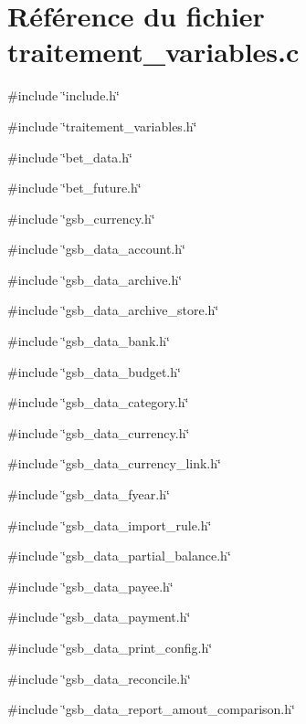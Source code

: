 \section{Référence du fichier traitement\_\-variables.c}
\label{traitement__variables_8c}
{\ttfamily \#include \char`\"{}include.h\char`\"{}}\par
{\ttfamily \#include \char`\"{}traitement\_\-variables.h\char`\"{}}\par
{\ttfamily \#include \char`\"{}bet\_\-data.h\char`\"{}}\par
{\ttfamily \#include \char`\"{}bet\_\-future.h\char`\"{}}\par
{\ttfamily \#include \char`\"{}gsb\_\-currency.h\char`\"{}}\par
{\ttfamily \#include \char`\"{}gsb\_\-data\_\-account.h\char`\"{}}\par
{\ttfamily \#include \char`\"{}gsb\_\-data\_\-archive.h\char`\"{}}\par
{\ttfamily \#include \char`\"{}gsb\_\-data\_\-archive\_\-store.h\char`\"{}}\par
{\ttfamily \#include \char`\"{}gsb\_\-data\_\-bank.h\char`\"{}}\par
{\ttfamily \#include \char`\"{}gsb\_\-data\_\-budget.h\char`\"{}}\par
{\ttfamily \#include \char`\"{}gsb\_\-data\_\-category.h\char`\"{}}\par
{\ttfamily \#include \char`\"{}gsb\_\-data\_\-currency.h\char`\"{}}\par
{\ttfamily \#include \char`\"{}gsb\_\-data\_\-currency\_\-link.h\char`\"{}}\par
{\ttfamily \#include \char`\"{}gsb\_\-data\_\-fyear.h\char`\"{}}\par
{\ttfamily \#include \char`\"{}gsb\_\-data\_\-import\_\-rule.h\char`\"{}}\par
{\ttfamily \#include \char`\"{}gsb\_\-data\_\-partial\_\-balance.h\char`\"{}}\par
{\ttfamily \#include \char`\"{}gsb\_\-data\_\-payee.h\char`\"{}}\par
{\ttfamily \#include \char`\"{}gsb\_\-data\_\-payment.h\char`\"{}}\par
{\ttfamily \#include \char`\"{}gsb\_\-data\_\-print\_\-config.h\char`\"{}}\par
{\ttfamily \#include \char`\"{}gsb\_\-data\_\-reconcile.h\char`\"{}}\par
{\ttfamily \#include \char`\"{}gsb\_\-data\_\-report\_\-amout\_\-comparison.h\char`\"{}}\par
